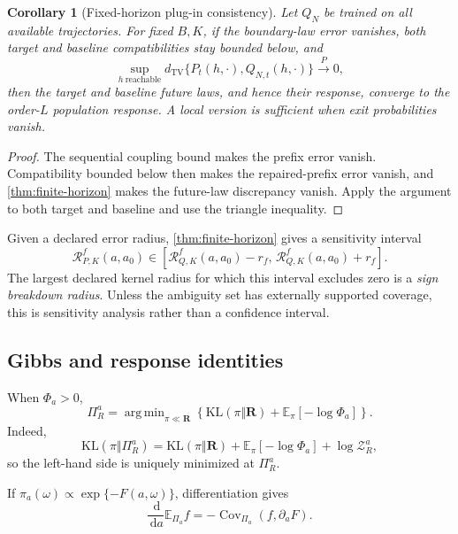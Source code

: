 \documentclass{article}
\newcommand{\E}{\mathbb E}
\newcommand{\KL}{\mathrm{KL}}
\newcommand{\TV}{d_{\mathrm{TV}}}
\newcommand{\Z}{\mathcal Z}
\newcommand{\PathR}{\mathbf R}
\newcommand{\dd}{\,\mathrm d}
\DeclareMathOperator*{\argmin}{arg\,min}
\DeclareMathOperator{\Cov}{Cov}
\newtheorem{corollary}[definition]{Corollary}
\theoremstyle{remark}
\begin{document}
\begin{corollary}[Fixed-horizon plug-in consistency]
\label{cor:plugin-app}
Let \(Q_N\) be trained on all available trajectories. For fixed \(B,K\), if
the boundary-law error vanishes, both target and baseline compatibilities stay
bounded below, and
\[
  \sup_{h\ \mathrm{reachable}}
  \TV\{P_t(h,\cdot),Q_{N,t}(h,\cdot)\}
  \xrightarrow{P}0,
\]
then the target and baseline future laws, and hence their response, converge
to the order-\(L\) population response. A local version is sufficient when
exit probabilities vanish.
\end{corollary}

\begin{proof}
The sequential coupling bound makes the prefix error vanish. Compatibility
bounded below then makes the repaired-prefix error vanish, and
\cref{thm:finite-horizon} makes the future-law discrepancy vanish. Apply the
argument to both target and baseline and use the triangle inequality.
\end{proof}

Given a declared error radius, \cref{thm:finite-horizon} gives a sensitivity
interval
\[
  \mathcal R_{P,K}^f(a,a_0)
  \in
  \left[
    \mathcal R_{Q,K}^f(a,a_0)-r_f,\,
    \mathcal R_{Q,K}^f(a,a_0)+r_f
  \right].
\]
The largest declared kernel radius for which this interval excludes zero is a
\emph{sign breakdown radius}. Unless the ambiguity set has externally
supported coverage, this is sensitivity analysis rather than a confidence
interval.

\subsection{Gibbs and response identities}
\label{app:gibbs}

When \(\Phi_a>0\),
\begin{equation}
  \Pi_R^a
  =
  \argmin_{\pi\ll\PathR}
  \left\{
    \KL(\pi\Vert\PathR)+\E_\pi[-\log\Phi_a]
  \right\}.
  \label{eq:gibbs-variational-app}
\end{equation}
Indeed,
\[
  \KL(\pi\Vert\Pi_R^a)
  =
  \KL(\pi\Vert\PathR)
  +
  \E_\pi[-\log\Phi_a]
  +
  \log\Z_R^a,
\]
so the left-hand side is uniquely minimized at \(\Pi_R^a\).

If \(\pi_a(\omega)\propto\exp\{-F(a,\omega)\}\), differentiation gives
\begin{equation}
  \frac{\dd}{\dd a}\E_{\Pi_a}f
  =
  -\Cov_{\Pi_a}\left(f,\partial_aF\right).
  \label{eq:response-identity-app}
\end{equation}
\end{document}
